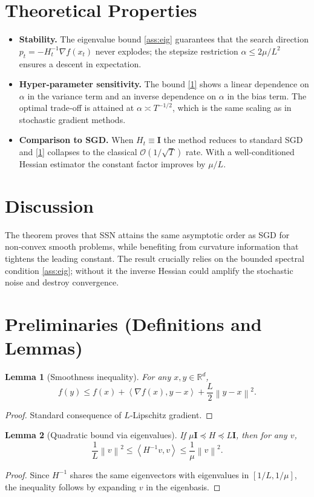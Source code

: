 \documentclass{article}
\newtheorem{lemma}{Lemma}
\newcommand{\norm}[1]{\left\|#1\right\|}
\newcommand{\ip}[2]{\left\langle #1,#2\right\rangle}
\newcommand{\Id}{\mathbf{I}}
\begin{document}
\section*{Theoretical Properties}
\begin{itemize}
\item \textbf{Stability.} The eigenvalue bound \ref{ass:eig} guarantees that the
search direction $p_t=-H_t^{-1}\nabla f(x_t)$ never explodes; the stepsize
restriction $\alpha\le 2\mu/L^2$ ensures a descent in expectation.
\item \textbf{Hyper‑parameter sensitivity.} The bound \eqref{1} shows a linear
dependence on $\alpha$ in the variance term and an inverse dependence on
$\alpha$ in the bias term. The optimal trade‑off is attained at
$\alpha\asymp T^{-1/2}$, which is the same scaling as in stochastic
gradient methods.
\item \textbf{Comparison to SGD.} When $H_t\equiv \Id$ the method reduces to
standard SGD and \eqref{1} collapses to the classical $\mathcal{O}(1/\sqrt{T})$
rate. With a well‑conditioned Hessian estimator the constant factor improves
by $\mu/L$.
\end{itemize}

\section*{Discussion}
The theorem proves that SSN attains the same asymptotic order as SGD for
non‑convex smooth problems, while benefiting from curvature information that
tightens the leading constant. The result crucially relies on the bounded
spectral condition \ref{ass:eig}; without it the inverse Hessian could amplify
the stochastic noise and destroy convergence.

\newpage
\section*{Preliminaries (Definitions and Lemmas)}
\begin{lemma}[Smoothness inequality]\label{lem:smooth}
For any $x,y\in\mathbb{R}^d$,
\[
f(y)\le f(x)+\ip{\nabla f(x)}{y-x}+\frac{L}{2}\norm{y-x}^2 .
\]
\end{lemma}
\begin{proof}
Standard consequence of $L$‑Lipschitz gradient. \qedhere
\end{proof}

\begin{lemma}[Quadratic bound via eigenvalues]\label{lem:eig}
If $\mu\Id\preceq H\preceq L\Id$, then for any $v$,
\[
\frac{1}{L}\norm{v}^2\le \ip{H^{-1}v}{v}\le\frac{1}{\mu}\norm{v}^2 .
\]
\end{lemma}
\begin{proof}
Since $H^{-1}$ shares the same eigenvectors with eigenvalues in $[1/L,1/\mu]$,
the inequality follows by expanding $v$ in the eigenbasis. \qedhere
\end{proof}
\end{document}
